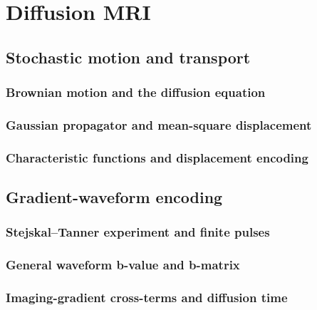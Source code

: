 \chapter{Diffusion MRI}
\label{ch:10}

\section{Stochastic motion and transport}
\label{sec:10:stochastic-motion-and-transport}
\subsection{Brownian motion and the diffusion equation}
\subsection{Gaussian propagator and mean-square displacement}
\subsection{Characteristic functions and displacement encoding}

\section{Gradient-waveform encoding}
\label{sec:10:gradient-waveform-encoding}
\subsection{Stejskal--Tanner experiment and finite pulses}
\subsection{General waveform b-value and b-matrix}
\subsection{Imaging-gradient cross-terms and diffusion time}

